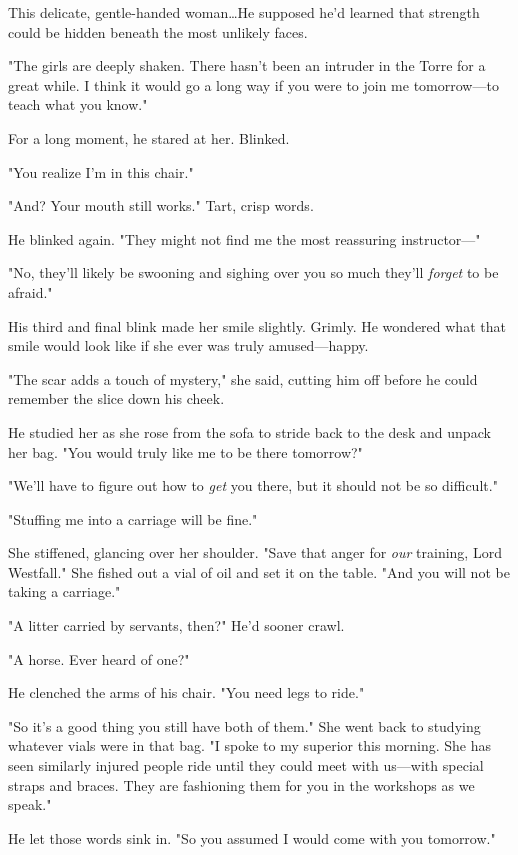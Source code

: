 This delicate, gentle-handed woman\ldots He supposed he'd learned that strength could be hidden beneath the most unlikely faces.

"The girls are deeply shaken.
There hasn't been an intruder in the Torre for a great while.
I think it would go a long way if you were to join me tomorrow---to teach what you know."

For a long moment, he stared at her.
Blinked.

"You realize I'm in this chair."

"And?
Your mouth still works."
Tart, crisp words.

He blinked again.
"They might not find me the most reassuring instructor---"

"No, they'll likely be swooning and sighing over you so much they'll \emph{forget} to be afraid."

His third and final blink made her smile slightly.
Grimly.
He wondered what that smile would look like if she ever was truly amused---happy.

"The scar adds a touch of mystery," she said, cutting him off before he could remember the slice down his cheek.

He studied her as she rose from the sofa to stride back to the desk and unpack her bag.
"You would truly like me to be there tomorrow?"

"We'll have to figure out how to \emph{get} you there, but it should not be so difficult."

"Stuffing me into a carriage will be fine."

She stiffened, glancing over her shoulder.
"Save that anger for \emph{our} training, Lord Westfall."
She fished out a vial of oil and set it on the table.
"And you will not be taking a carriage."

"A litter carried by servants, then?"
He'd sooner crawl.

"A horse.
Ever heard of one?"

He clenched the arms of his chair.
"You need legs to ride."

"So it's a good thing you still have both of them."
She went back to studying whatever vials were in that bag.
"I spoke to my superior this morning.
She has seen similarly injured people ride until they could meet with us---with special straps and braces.
They are fashioning them for you in the workshops as we speak."

He let those words sink in.
"So you assumed I would come with you tomorrow."

